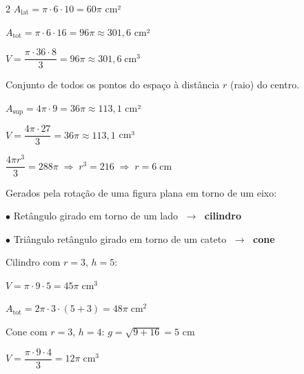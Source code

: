 \documentclass[12pt]{article}
\begin{document}
\begin{multicols}{2}
$A_{\text{lat}} = \pi \cdot 6 \cdot 10 = 60\pi$ cm²

$A_{\text{tot}} = \pi \cdot 6 \cdot 16 = 96\pi \approx 301{,}6$ cm²

$V = \dfrac{\pi \cdot 36 \cdot 8}{3} = 96\pi \approx 301{,}6\;\text{cm}^3$


Conjunto de todos os pontos do espaço à distância $r$ (raio) do centro.

\vspace{-8pt}


$A_{\text{sup}} = 4\pi \cdot 9 = 36\pi \approx 113{,}1$ cm²

$V = \dfrac{4\pi \cdot 27}{3} = 36\pi \approx 113{,}1$ cm³


$\dfrac{4\pi r^3}{3} = 288\pi \;\Rightarrow\; r^3 = 216 \;\Rightarrow\; r = \boxed{6\;\text{cm}}$



Gerados pela rotação de uma figura plana em torno de um eixo:

$\bullet$ Retângulo girado em torno de um lado $\;\rightarrow\;$ \textbf{cilindro}

$\bullet$ Triângulo retângulo girado em torno de um cateto $\;\rightarrow\;$ \textbf{cone}


Cilindro com $r = 3$, $h = 5$:

$V = \pi \cdot 9 \cdot 5 = 45\pi\;\text{cm}^3$

$A_{\text{tot}} = 2\pi \cdot 3 \cdot (5+3) = 48\pi\;\text{cm}^2$


Cone com $r = 3$, $h = 4$: \quad $g = \sqrt{9+16} = 5$ cm

$V = \dfrac{\pi \cdot 9 \cdot 4}{3} = 12\pi\;\text{cm}^3$

\end{multicols}


\end{document}
